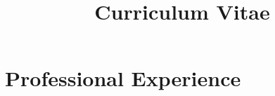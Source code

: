\documentclass[11pt,a4paper,sans]{moderncv} %
\title{Curriculum Vitae}
\begin{document}
\label{Summary}

\makecvtitle %






\section{Professional Experience}
\end{document}

